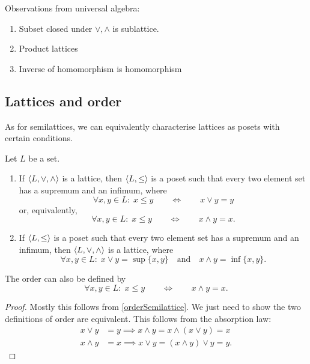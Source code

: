 \begin{proposition}
Observations from universal algebra:
\begin{enumerate}
\item Subset closed under $\vee,\wedge$ is sublattice.
\item Product lattices
\item Inverse of homomorphism is homomorphism
\end{enumerate}
\end{proposition}


\subsection{Lattices and order}
As for semilattices, we can equivalently characterise lattices as posets with certain conditions.
\begin{proposition}
Let $L$ be a set.
\begin{enumerate}
\item If $\langle L,\vee, \wedge \rangle$ is a lattice, then $\langle L,\leq \rangle$ is a poset such that every two element set has a supremum and an infimum, where
\[ \forall x,y\in L:\; x\leq y \qquad \iff \qquad x\vee y = y \]
or, equivalently,
\[ \forall x,y\in L:\; x\leq y \qquad \iff \qquad x\wedge y = x. \]
\item If $\langle L,\leq \rangle$ is a poset such that every two element set has a supremum and an infimum, then $\langle L,\vee, \wedge \rangle$ is a lattice, where
\[ \forall x,y\in L: \; x\vee y = \sup\{x,y\} \quad \text{and} \quad x\wedge y = \inf\{x,y\}. \]
\end{enumerate}
The order can also be defined by
\[ \forall x,y\in L:\; x\leq y \qquad \iff \qquad x\wedge y = x. \]
\end{proposition}
\begin{proof}
Mostly this follows from \ref{orderSemilattice}. We just need to show the two definitions of order are equivalent. This follows from the absorption law:
\begin{align*}
x\vee y &= y \implies x\wedge y = x\wedge (x\vee y) = x \\
x\wedge y &= x \implies x\vee y = (x\wedge y) \vee y = y.
\end{align*}
\end{proof}

